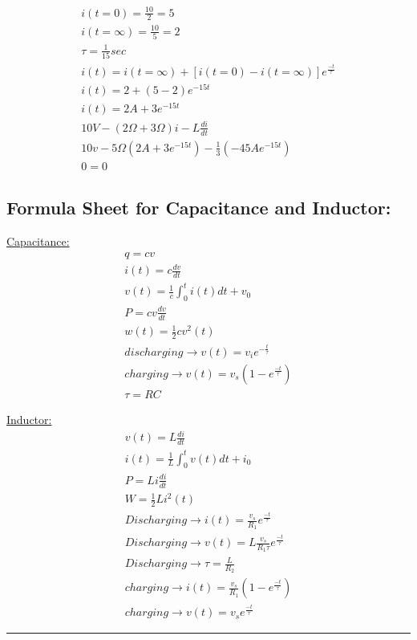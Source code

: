 \documentclass[a4paper,12]{article}
\begin{document}
\begin{gather}
    i(t=0)=\frac{10}{2}=5\\
    i(t=\infty)=\frac{10}{5}=2\\
    \tau=\frac{1}{15}sec\\
    i(t)=i(t=\infty)+[i(t=0)-i(t=\infty)]e^{\frac{-t}{\tau}}\\
    i(t)=2+(5-2)e^{-15t}\\
    i(t)=2A+3e^{-15t}\\
    10V-(2\Omega +3\Omega)i-L\frac{di}{dt}\\
    10v-5\Omega (2A+3e^{-15t})-\frac{1}{3}(-45Ae^{-15t})\\
    0=0
\end{gather}
    \newpage
 \subsection{Formula Sheet for Capacitance and Inductor:}
 
 \begin{multicols}{2}
 \underline{Capacitance:}
 \begin{gather}
    q=cv\\
    i(t)=c\frac{dv}{dt}\\
    v(t)=\frac{1}{c}\int _0^t i(t)dt+v_0\\
    P=cv\frac{dv}{dt}\\
    w(t)=\frac{1}{2}cv^2(t)\\
    discharging\rightarrow v(t)=v_i e^{-\frac{t}{\tau}}\\
    charging\rightarrow v(t)=v_s(1- e^{\frac{-t}{\tau}})\\
    \tau=RC 
 \end{gather}
 
\columnbreak

\underline{Inductor:}
\begin{gather}
v(t)=L\frac{di}{dt}\\
i(t)=\frac{1}{L}\int_0^t v(t)dt+i_0\\
P=Li\frac{di}{dt}\\
W=\frac{1}{2}Li^2(t)\\
    Discharging\rightarrow i(t)=\frac{v_s}{R_1}e^{\frac{-t}{\tau}}\\
    Discharging\rightarrow v(t)=L\frac{v_s}{R_1\tau}e^{\frac{-t}{\tau}}\\
   Discharging\rightarrow  \tau=\frac{L}{R_2}\\
   charging\rightarrow i(t)=\frac{v_s}{R_1}(1-e^{\frac{-t}{\tau}})\\
   charging\rightarrow v(t)=v_s e^{\frac{-t}{\tau}}
\end{gather}
 \end{multicols}\hrule
\end{document}
